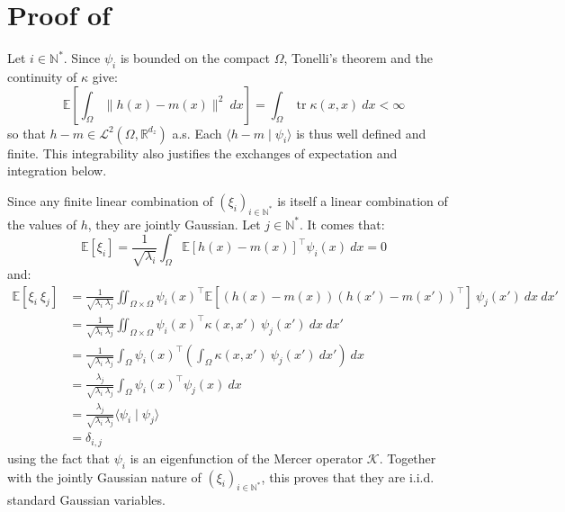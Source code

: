 \section[Proof of Proposition 3.19]{Proof of }\label{sec:proof_KL}

Let $i\in\mathbb{N}^*$. Since $\psi_i$ is bounded on the compact $\Omega$, Tonelli's theorem \cite{bib:Tonelli} and the continuity of $\kappa$ give:
\begin{equation}
	\mathbb{E}\left[\int_{\Omega}{\|h(x)-m(x)\|^2\:dx}\right]=\int_{\Omega}{\operatorname{tr}\kappa(x,x)\:dx}<\infty
\end{equation}
so that $h-m\in\mathcal{L}^2(\Omega,\mathbb{R}^{d_z})$ a.s. Each $\langle h-m\mid\psi_i\rangle$ is thus well defined and finite. This integrability also justifies the exchanges of expectation and integration below.

Since any finite linear combination of $(\xi_i)_{i\in\mathbb{N}^*}$ is itself a linear combination of the values of $h$, they are jointly Gaussian. Let $j\in\mathbb{N}^*$. It comes that:
\begin{equation}
	\mathbb{E}[\xi_i]=\frac{1}{\sqrt{\lambda_i}}\int_{\Omega}{\mathbb{E}[h(x)-m(x)]^\top\psi_i(x)\:dx}=0
\end{equation}
and:
\begin{equation}
	\begin{aligned}
	\mathbb{E}[\xi_i\:\xi_j]&=\frac{1}{\sqrt{\lambda_i\:\lambda_j}}\iint_{\Omega\times\Omega}{\psi_i(x)^\top\mathbb{E}[(h(x)-m(x))(h(x')-m(x'))^\top]\:\psi_j(x')\:dx\:dx'}\\
	&=\frac{1}{\sqrt{\lambda_i\:\lambda_j}}\iint_{\Omega\times\Omega}{\psi_i(x)^\top \kappa(x,x')\:\psi_j(x')\:dx\:dx'}\\
	&=\frac{1}{\sqrt{\lambda_i\:\lambda_j}}\int_{\Omega}{\psi_i(x)^\top\left(\int_{\Omega}{\kappa(x,x')\:\psi_j(x')\:dx'}\right)\:dx}\\
	&=\frac{\lambda_j}{\sqrt{\lambda_i\:\lambda_j}}\int_{\Omega}{\psi_i(x)^\top\psi_j(x)\:dx}\\
	&=\frac{\lambda_j}{\sqrt{\lambda_i\:\lambda_j}}\langle\psi_i\mid\psi_j\rangle\\
	&=\delta_{i,j}
	\end{aligned}
\end{equation}
using the fact that $\psi_i$ is an eigenfunction of the Mercer operator $\mathcal{K}$. Together with the jointly Gaussian nature of $(\xi_i)_{i\in\mathbb{N}^*}$, this proves that they are i.i.d. standard Gaussian variables.

